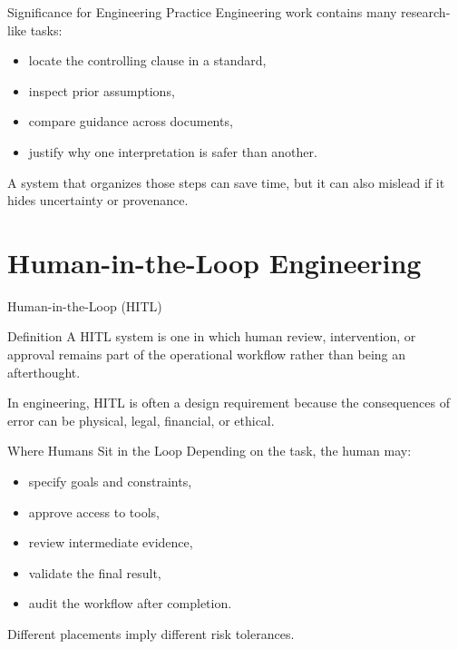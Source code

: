 \documentclass[12pt]{beamer}
\begin{document}
\begin{frame}{Significance for Engineering Practice}
  Engineering work contains many research-like tasks:
  \begin{itemize}
    \item locate the controlling clause in a standard,
    \item inspect prior assumptions,
    \item compare guidance across documents,
    \item justify why one interpretation is safer than another.
  \end{itemize}

  A system that organizes those steps can save time, but it can also mislead if it hides uncertainty or provenance.
\end{frame}

\section{Human-in-the-Loop Engineering}

\begin{frame}{Human-in-the-Loop (HITL)}
  \begin{conceptbox}{Definition}
    A HITL system is one in which human review, intervention, or approval remains part of the operational workflow rather than being an afterthought.
  \end{conceptbox}

  In engineering, HITL is often a design requirement because the consequences of error can be physical, legal, financial, or ethical.
\end{frame}

\begin{frame}{Where Humans Sit in the Loop}
  Depending on the task, the human may:
  \begin{itemize}
    \item specify goals and constraints,
    \item approve access to tools,
    \item review intermediate evidence,
    \item validate the final result,
    \item audit the workflow after completion.
  \end{itemize}

  Different placements imply different risk tolerances.
\end{frame}
\end{document}
